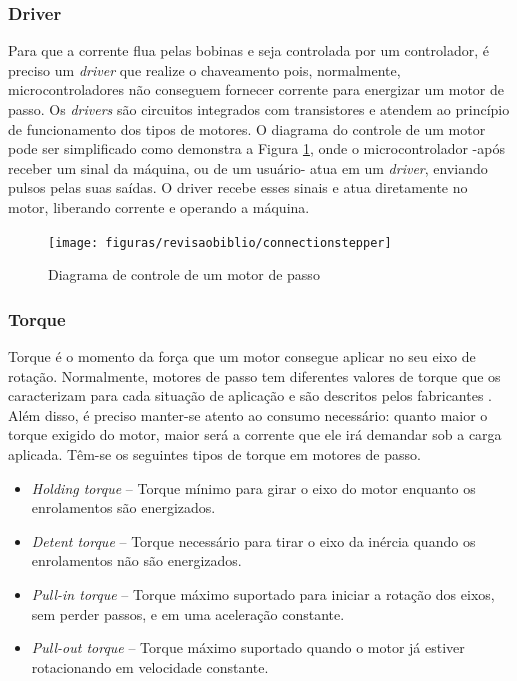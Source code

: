 \subsubsection{Driver}

Para que a corrente flua pelas bobinas e seja controlada por um controlador, é preciso um \textit{driver} que realize o chaveamento pois, normalmente, microcontroladores não conseguem fornecer corrente para energizar um motor de passo. Os \textit{drivers} são circuitos integrados com transistores e atendem ao princípio de funcionamento dos tipos de motores. O diagrama do controle de um motor pode ser simplificado como demonstra a Figura \ref{fig:connectionstepper}, onde o microcontrolador -após receber um sinal da máquina, ou de um usuário- atua em um \textit{driver}, enviando pulsos pelas suas saídas. O driver recebe esses sinais e atua diretamente no motor, liberando corrente e operando a máquina.

\begin{figure}[!htb]
	\centering
	\caption{Diagrama de controle de um motor de passo}
	\texttt{[image: figuras/revisaobiblio/connectionstepper]}
	\label{fig:connectionstepper}
\end{figure}

\subsubsection{Torque}

Torque é o momento da força que um motor consegue aplicar no seu eixo de rotação. Normalmente, motores de passo tem diferentes valores de torque que os caracterizam para cada situação de aplicação e são descritos pelos fabricantes \cite{manual:stepperMicrochip}. Além disso, é preciso manter-se atento ao consumo necessário: quanto maior o torque exigido do motor, maior será a corrente que ele irá demandar sob a carga aplicada. Têm-se os seguintes tipos de torque em motores de passo. 

\begin{itemize}
	\item \textit{Holding torque} – Torque mínimo para girar o eixo do motor enquanto os enrolamentos são energizados.
	
	\item \textit{Detent torque} – Torque necessário para tirar o eixo da inércia quando os enrolamentos não são energizados.
	
	\item \textit{Pull-in torque} – Torque máximo suportado para iniciar a rotação dos eixos, sem perder passos, e em uma aceleração constante.
	
	\item \textit{Pull-out torque} – Torque máximo suportado quando o motor já estiver rotacionando em velocidade constante.

\end{itemize}

